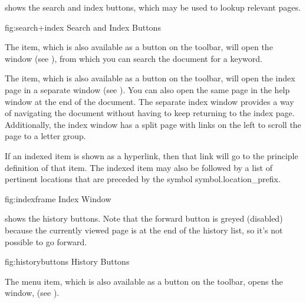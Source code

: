  shows the search and index buttons,
which may be used to lookup relevant pages.

\FloatFig
{fig:search+index}
{%
}
{Search and Index Buttons}


The  item, which is also available
as a button on the toolbar, will open the
 window (see
), from which you can search the document
for a keyword.


The  item, which is also available
as a button on the toolbar, will open the index page in a separate
window (see ). You can also open the same
page in the help window at the end of the document. The separate index window
provides a way of navigating the document without having to keep
returning to the index page. Additionally, the index window has a
split page with links on the left to scroll the page to a letter
group.

If an indexed item is shown as a hyperlink, then that link will go
to the principle definition of that item. The indexed item may also
be followed by a list of pertinent locations that are preceded by
the symbol \gls{symbol.location_prefix}.

\FloatFig
{fig:indexframe}
{%
}
{Index Window}

 shows the history buttons.
Note that the forward button is greyed (disabled) because the
currently viewed page is at the end of the history list, so it's not
possible to go forward.

\FloatFig
 {fig:historybuttons}
 {%
 }
 {History Buttons}


The  menu item, which is also
available as a button on the toolbar, opens the
 window,
(see ).

